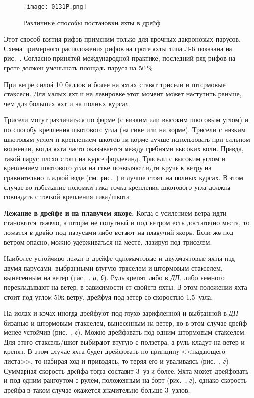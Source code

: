 \begin{figure*}[h]
  \centering{}
  \texttt{[image: 0131P.png]}
  \caption{Различные способы постановки яхты в дрейф}
  \label{fig:131}
\end{figure*}

Этот способ взятия рифов применим только для прочных дакроновых
парусов. Схема примерного расположения рифов на гроте яхты типа Л-6
показана на рис.~. Согласно принятой международной практике,
последний ряд рифов на гроте должен уменьшать площадь паруса на
50\,\%.

При ветре силой 10 баллов и более на яхтах ставят трисели и штормовые
стаксели. Для малых яхт и на лавировке этот момент может наступить
раньше, чем для больших яхт и на полных курсах.

Трисели могут различаться по форме (с низким или высоким шкотовым
углом) и по способу крепления шкотового угла (на гике или на
корме). Трисели с низким шкотовым углом и креплением шкотов на корме
лучше использовать при сильном волнении, когда яхта часто оказывается
между гребнями высоких волн. Правда, такой парус плохо стоит на курсе
фордевинд. Трисели с высоким углом и креплением шкотового угла на гике
позволяют идти круче к ветру на сравнительно гладкой воде
(см. рис.~) и лучше стоят на полных курсах. В этом случае во
избежание поломки гика точка крепления шкотового угла должна совпадать
с точкой крепления гика\-/шкота.

\textbf{Лежание в дрейфе и на плавучем
  якоре.} Когда с усилением ветра
идти становится тяжело, а шторм не попутный и под ветром есть
достаточно места, то ложатся в дрейф под парусами либо встают на
плавучий якорь. Если же под ветром опасно, можно удерживаться на
месте, лавируя под триселем.

Наиболее устойчиво лежат в дрейфе одномачтовые и двухмачтовые яхты под
двумя парусами: выбранными втугую триселем и штормовым стакселем,
вынесенным на ветер (рис.~, \textit{а}, \textit{б}). Руль
крепят либо в \textit{ДП}, либо немного перекладывают на ветер, в
зависимости от свойств яхты. В этом положении яхта стоит под углом
50\gr к ветру, дрейфуя под ветер со скоростью 1,5~узла.

На иолах и кэчах иногда дрейфуют под глухо зарифленной и выбранной в
\textit{ДП} бизанью и штормовым стакселем, вынесенным на ветер, но в
этом случае дрейф менее устойчив (рис.~, \textit{в}). Можно
дрейфовать под одним штормовым стакселем. Для этого стаксель\-/шкот
выбирают втугую с полветра, а руль кладут на ветер и крепят. В этом
случае яхта будет дрейфовать по принципу <<падающего листа>>, то
набирая ход и приводясь, то теряя его и уваливаясь (рис.~,
\textit{г}). Суммарная скорость дрейфа тогда составит 3~уз и
более. Яхта может дрейфовать и под одним рангоутом с рулём, положенным
на борт (рис.~, \textit{г}), однако скорость дрейфа в таком
случае окажется значительно больше 3~узлов.

